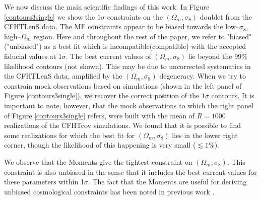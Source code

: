 \documentclass[reprint,aps,prd,superscriptaddress,showkeys,showpacs]{revtex4-1}
\begin{document}
We now discuss the main scientific findings of this work. In Figure \ref{contours3single} we show the $1\sigma$ constraints on the $(\Omega_m,\sigma_8)$ doublet from the CFHTLenS data. The MF constraints appear to be biased towards the low--$\sigma_8$, high--$\Omega_m$ region. Here and throughout the rest of the paper, we refer to "biased"("unbiased") as a best fit which is incompatible(compatible) with the accepted fiducial values at $1\sigma$. The best current values of $(\Omega_m,\sigma_8)$  \citep{PlanckXVI2013} lie beyond the 99\% likelihood contours (not shown). This may be due to uncorrected systematics in the CFHTLenS data, amplified by the $(\Omega_m,\sigma_8)$ degeneracy. When we try to constrain mock observations based on simulations (shown in the left panel of Figure \ref{contours3single}), we recover the correct position of the $1\sigma$ contours.  It is important to note, however, that the mock observations to which the right panel of Figure \ref{contours3single} refers, were built with the mean of $R=1000$ realizations of the CFHTcov simulations. We found that it is possible to find some realizations for which the best fit for $(\Omega_m,\sigma_8)$ lies in the lower right corner, though the likelihood of this happening is very small ($\lesssim1\%$). 


We observe that the Moments give the tightest constraint on $(\Omega_m,\sigma_8)$.  This constraint is also unbiased in the sense that it includes the best current values for these parameters within 1$\sigma$. The fact that the Moments are useful for deriving unbiased cosmological constraints has been noted in previous work  \citep{PetriSpurious}. 
\end{document}
